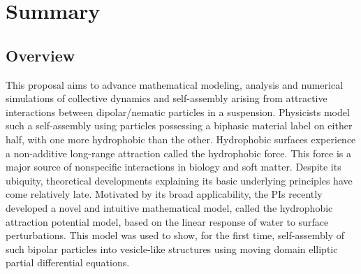 \documentclass[10pt]{article}
\begin{document}
\section*{Summary}


\subsection*{Overview}
\vspace{-0.1in}
This proposal aims to advance mathematical modeling, analysis and numerical simulations of
collective dynamics and self-assembly arising from attractive
interactions between dipolar/nematic particles in a suspension. 
%
%
Physicists model such a self-assembly
using particles possessing a biphasic material label on either half,
with one more hydrophobic than the other. Hydrophobic surfaces
experience a non-additive long-range attraction called the hydrophobic
force. This force is a major source of nonspecific interactions in
biology and soft matter. Despite its ubiquity, theoretical developments
explaining its basic underlying principles have come relatively late.
Motivated by its broad applicability, the PIs recently developed a novel
and intuitive mathematical model, called the hydrophobic attraction
potential model, based on the linear response of water to surface
perturbations. This model was used to show, for the first time,
self-assembly of such bipolar particles into vesicle-like structures
using moving domain elliptic partial differential equations.



\end{document}
